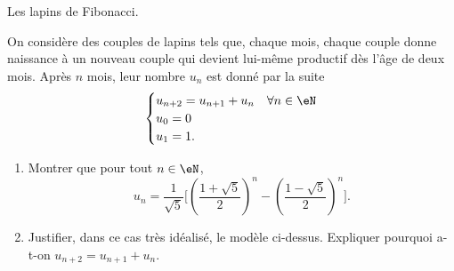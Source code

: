 
\begin{exercice}\label{exoTD3-0011}

	Les lapins de Fibonacci.

	On considère des couples de lapins tels que, chaque mois, chaque couple donne naissance à un nouveau couple qui devient lui-même productif dès l'âge de deux mois. Après $n$ mois, leur nombre $u_n$ est donné par la suite
	\begin{equation}
		\begin{cases}
			u_{n+2}=u_{n+1}+u_n	&	\forall n\in\eN\\
			u_0=0\\
			u_1=1.	&	 
		\end{cases}
	\end{equation}
	\begin{enumerate}
		\item
			Montrer que pour tout $n\in\eN$,
			\begin{equation}
				u_n=\frac{1}{ \sqrt{5} }\Big[ \left( \frac{ 1+\sqrt{5} }{2} \right)^n-\left( \frac{ 1-\sqrt{5} }{2} \right)^n \Big].
			\end{equation}
		\item
			Justifier, dans ce cas très idéalisé, le modèle ci-dessus. Expliquer pourquoi a-t-on $u_{n+2}=u_{n+1}+u_n$.
	\end{enumerate}

\end{exercice}
